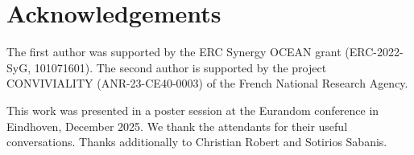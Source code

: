 \documentclass{article}
\begin{document}
\section*{Acknowledgements}
The first author was supported by the ERC Synergy OCEAN grant (ERC-2022-SyG, 101071601). The second author is supported by the project CONVIVIALITY (ANR-23-CE40-0003) of the French National Research Agency.

This work was presented in a poster session at the Eurandom conference in Eindhoven, December 2025. We thank the attendants for their useful conversations. Thanks additionally to Christian Robert and Sotirios Sabanis.




\end{document}
